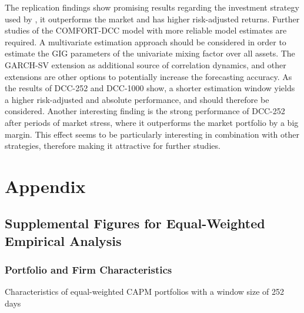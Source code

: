 \documentclass[11pt,a4paper]{article}
\begin{document}
The replication findings show promising results regarding the investment strategy used by , it outperforms the market and has higher risk-adjusted returns. Further studies of the COMFORT-DCC model with more reliable model estimates are required. A multivariate estimation approach should be considered in order to estimate the GIG parameters of the univariate mixing factor over all assets. The GARCH-SV extension as additional source of correlation dynamics, and other extensions are other options to potentially increase the forecasting accuracy. As the results of DCC-252 and DCC-1000 show, a shorter estimation window yields a higher risk-adjusted and absolute performance, and should therefore be considered. Another interesting finding is the strong performance of DCC-252 after periods of market stress, where it outperforms the market portfolio by a big margin. This effect seems to be particularly interesting in combination with other strategies, therefore making it attractive for further studies.






\newpage







\newpage
\appendix
\section{Appendix}





\subsection{Supplemental Figures for Equal-Weighted Empirical Analysis}

\subsubsection{Portfolio and Firm Characteristics}

\begin{table}[H]
    \caption{Characteristics of equal-weighted CAPM portfolios with a window size of 252 days}
    \label{table:eq_CAPM_portfolio_characteristics_appendix}
    \begin{threeparttable}
    \end{threeparttable}    
\end{table}
\end{document}

